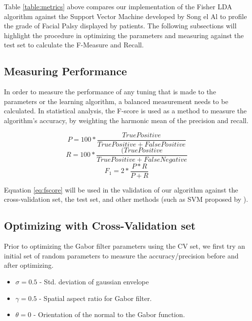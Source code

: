 \documentclass[12pt, conference]{IEEEtran}
\begin{document}
Table \ref{table:metrics} above compares our implementation of the Fisher LDA algorithm against the Support Vector Machine developed by Song el Al\cite{1} to profile the grade of Facial Palsy displayed by patients. The following subsections will highlight the procedure in optimizing the parameters and measuring against the test set to calculate the F-Measure and Recall.

\subsection{Measuring Performance}
In order to measure the performance of any tuning that is made to the parameters or the learning algorithm, a balanced measurement needs to be calculated. In statistical analysis, the F-score is used as a method to measure the algorithm's accuracy, by weighting the harmonic mean of the precision and recall.

\begin{equation}
	P = 100 * \frac{TruePositive}{TruePositive + FalsePositive}
\end{equation}
\begin{equation}
	R = 100 * \frac{(TruePositive}{TruePositive + FalseNegative}
\end{equation}
\begin{equation}
	F_1 = 2 * \frac{P * R}{P + R}
	\label{eq:fscore}
\end{equation}

Equation \ref{eq:fscore} will be used in the validation of our algorithm against the cross-validation set, the test set, and other methods (such as SVM proposed by \cite{1}).

\subsection{Optimizing with Cross-Validation set}
Prior to optimizing the Gabor filter parameters using the CV set, we first try an initial set of random parameters to measure the accuracy/precision before and after optimizing.

\begin{itemize}
	\item $\sigma=0.5$ - Std. deviation of gaussian envelope
	\item $\gamma=0.5$ - Spatial aspect ratio for Gabor filter.
	\item $\theta=0$ - Orientation of the normal to the Gabor function.
\end{itemize}
\end{document}
